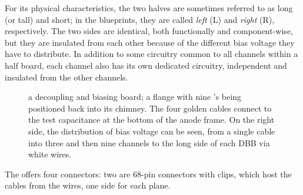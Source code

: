 For its physical characteristics, the two halves are sometimes referred to as
long (or tall) and short; in the blueprints, they are called \emph{left} (L)
and \emph{right} (R), respectively.
The two sides are identical, both functionally and component-wise, but they are
insulated from each other because of the different bias voltage they have to
distribute.
In addition to some circuitry common to all channels within a half board, each
channel also has its own dedicated circuitry, independent and insulated from
the other channels.
\begin{figure}
  \caption{
    \protect{}
      a decoupling and biasing board;
    \protect{}
      a flange with nine \DBB's being positioned back into its chimney.
    The four golden cables connect to the test capacitance at the bottom of the
    anode frame. On the right side, the distribution of bias voltage can be
    seen, from a single cable into three and then nine channels to the long side
    of each DBB via white wires.
  }
\end{figure}
The \DBB offers four connectors: two are 68-pin connectors with clips, which
host the cables from the wires, one side for each plane.
